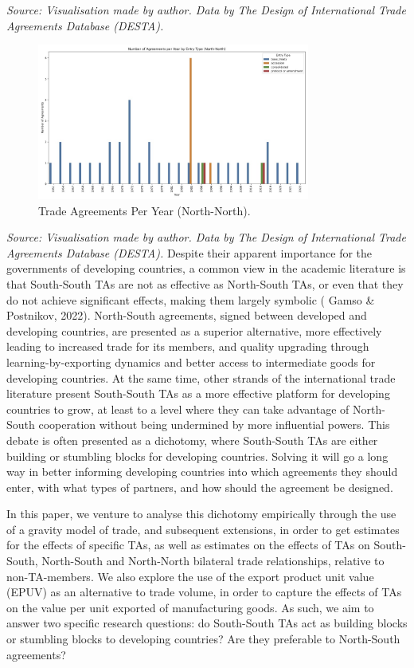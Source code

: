 \documentclass[12pt]{article}%
\begin{document}
%
\FloatBarrier%
\textit{Source: Visualisation made by author. Data by The Design of International Trade Agreements Database (DESTA).}%
\FloatBarrier%


\begin{figure}[h!]%
\centering%
\includegraphics[width=0.8\textwidth]{figures/agreements_per_year_North-North.jpg}%
\caption{Trade Agreements Per Year (North{-}North).}%
\end{figure}

%
\FloatBarrier%
\textit{Source: Visualisation made by author. Data by The Design of International Trade Agreements Database (DESTA).}%
\FloatBarrier%
Despite their apparent importance for the governments of developing
countries, a common view in the academic literature is that South-South
TAs are not as effective as North-South TAs, or even that they do not
achieve significant effects, making them largely symbolic (\cite{gamso_leveling-up_2022} Gamso \&
Postnikov, 2022). North-South agreements, signed between developed and
developing countries, are presented as a superior alternative, more
effectively leading to increased trade for its members, and quality
upgrading through learning-by-exporting dynamics and better access to
intermediate goods for developing countries. At the same time, other
strands of the international trade literature present South-South TAs as
a more effective platform for developing countries to grow, at least to
a level where they can take advantage of North-South cooperation without
being undermined by more influential powers. This debate is often
presented as a dichotomy, where South-South TAs are either building or
stumbling blocks for developing countries. Solving it will go a long
way in better informing developing countries into which agreements they
should enter, with what types of partners, and how should the agreement
be designed.

In this paper, we venture to analyse this dichotomy empirically through
the use of a gravity model of trade, and subsequent extensions, in order
to get estimates for the effects of specific TAs, as well as estimates
on the effects of TAs on South-South, North-South and North-North
bilateral trade relationships, relative to non-TA-members. We also
explore the use of the export product unit value (EPUV) as an
alternative to trade volume, in order to capture the effects of TAs on
the value per unit exported of manufacturing goods. As such, we aim to answer
two specific research questions: do South-South TAs act as building
blocks or stumbling blocks to developing countries? Are they preferable
to North-South agreements?
\end{document}
